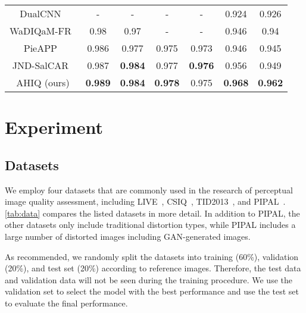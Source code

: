 \documentclass[10pt,twocolumn,letterpaper]{article}
\begin{document}
\begin{table*}[th]
{\begin{tabular}{ccccccc}
DualCNN~\cite{varga2020composition}                 & -           & -          & -           & -          & 0.924        & 0.926        \\
WaDIQaM-FR~\cite{bosse2017deep}              & 0.98        & 0.97       & -           & -          & 0.946        & 0.94         \\
PieAPP~\cite{prashnani2018pieapp}                  & 0.986       & 0.977      & 0.975       & 0.973      & 0.946        & 0.945        \\
JND-SalCAR~\cite{seo2020novel} & 0.987          & \textbf{0.984} & 0.977          & \textbf{0.976} & 0.956          & 0.949          \\
AHIQ (ours) & \textbf{0.989} & \textbf{0.984} & \textbf{0.978} & 0.975          & \textbf{0.968} & \textbf{0.962}       \\ \toprule[1.2pt]

\end{tabular}}
\label{tab:sota}
\end{table*}

\section{Experiment}
\subsection{Datasets}

We employ four datasets that are commonly used in the research of perceptual image quality assessment, including LIVE~\cite{sheikh2006statistical}, CSIQ~\cite{larson2010most}, TID2013~\cite{ponomarenko2015image}, and PIPAL~\cite{jinjin2020pipal}. \cref{tab:data} compares the listed datasets in more detail. In addition to PIPAL, the other datasets only include traditional distortion types, while PIPAL includes a large number of distorted images including GAN-generated images. 

As recommended, we randomly split the datasets into training (60\%), validation (20\%), and test set (20\%) according to reference images. Therefore, the test data and validation data will not be seen during the training procedure. We use the validation set to select the model with the best performance and use the test set to evaluate the final performance.
\end{document}
